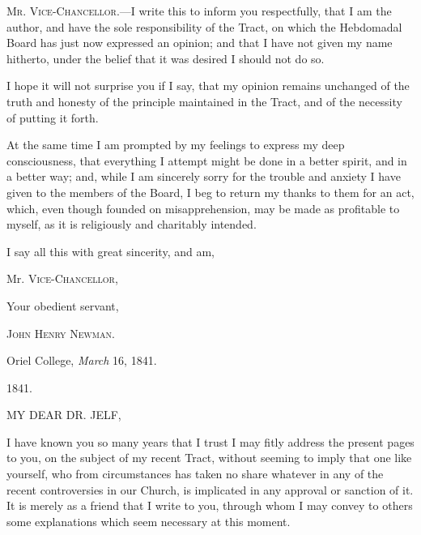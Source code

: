 
M\textsc{r}. V\textsc{ice}-C\textsc{hancellor}.—I
write this to inform you respectfully, that I am the author, and have
the sole responsibility of the Tract, on which the Hebdomadal Board
has just now expressed an opinion; and that I have not given my name
hitherto, under the belief that it was desired I should not do so.

I hope it will not surprise you if I say, that my opinion remains
unchanged of the truth and honesty of the principle maintained in the
Tract, and of the necessity of putting it forth.

At the same time I am prompted by my feelings to express my deep
consciousness, that everything I attempt might be done in a better
spirit, and in a better way; and, while I am sincerely sorry for the
trouble and anxiety I have given to the members of the Board, I beg to
return my thanks to them for an act, which, even though founded on
misapprehension, may be made as profitable to myself, as it is
religiously and charitably intended.

I say all this with great sincerity, and am,

Mr. V\textsc{ice}-C\textsc{hancellor},

Your obedient servant,

J\textsc{ohn} H\textsc{enry} N\textsc{ewman}.

Oriel College, \emph{March} 16, 1841.






1841.


MY DEAR
DR. JELF,

I have known you so many years that I trust I may fitly address the
present pages to you, on the subject of my recent Tract, without
seeming to imply that one like yourself, who from circumstances has
taken no share whatever in any of the recent controversies in our
Church, is implicated in any approval or sanction of it. It is merely
as a friend that I write to you, through whom I may convey to others
some explanations which seem necessary at this moment.

